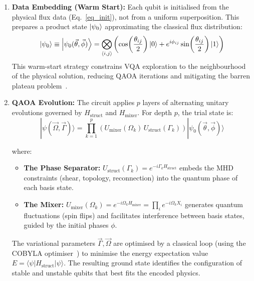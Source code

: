 \documentclass[12pt, a4paper, oneside]{report}
\begin{document}
\begin{enumerate}
    \item \textbf{Data Embedding (Warm Start):}
    Each qubit is initialised from the physical flux data (Eq.~\ref{eq_init}), not from a uniform superposition. This prepares a product state $\ket{\psi_0}$ approximating the classical flux distribution:
    \begin{equation}
        \ket{\psi_0} \equiv \ket{\psi_0(\vec{\theta},\vec{\phi})} = \bigotimes_{\langle i,j \rangle} \left( \cos\!\left(\frac{\theta_{ij}}{2}\right)\ket{0} + e^{i\phi_{ij}}\sin\!\left(\frac{\theta_{ij}}{2}\right)\ket{1} \right)
    \end{equation}
    This warm-start strategy constrains VQA exploration to the neighbourhood of the physical solution, reducing QAOA iterations and mitigating the barren plateau problem~\cite{mcclean2018}.

    \item \textbf{QAOA Evolution:}
    The circuit applies $p$ layers of alternating unitary evolutions governed by $H_{\text{struct}}$ and $H_{\text{mixer}}$. For depth $p$, the trial state is:
    \begin{equation}
        |\psi(\vec{\Omega},\vec{\Gamma})\rangle = \prod_{k=1}^{p} \left( U_{\text{mixer}}(\Omega_k)\, U_{\text{struct}}(\Gamma_k) \right) |\psi_0(\vec{\theta},\vec{\phi})\rangle
    \end{equation}

    where:
    \begin{itemize}
        \item \textbf{The Phase Separator:} $U_{\text{struct}}(\Gamma_k) = e^{-i\Gamma_k H_{\text{struct}}}$ embeds the MHD constraints (shear, topology, reconnection) into the quantum phase of each basis state.
        \item \textbf{The Mixer:} $U_{\text{mixer}}(\Omega_k) = e^{-i\Omega_k H_{\text{mixer}}} = \prod_i e^{-i\Omega_k X_i}$ generates quantum fluctuations (spin flips) and facilitates interference between basis states, guided by the initial phases $\phi$.
    \end{itemize}

The variational parameters $\vec{\Gamma}, \vec{\Omega}$ are optimised by a classical loop (using the COBYLA optimiser~\cite{powell1994}) to minimise the energy expectation value $E = \langle \psi | H_{\text{struct}} | \psi \rangle$. The resulting ground state identifies the configuration of stable and unstable qubits that best fits the encoded physics.

\end{enumerate}
\end{document}
